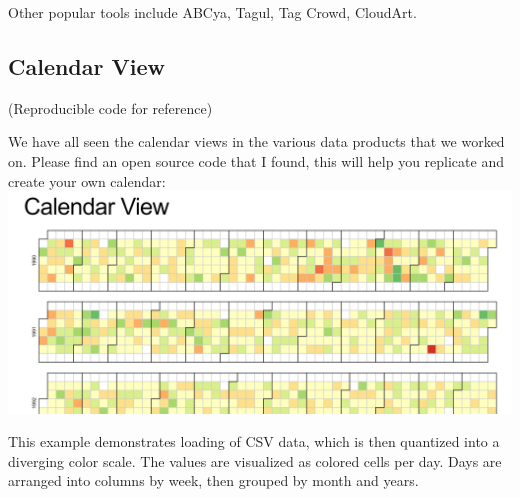 \documentclass[]{book}
\theoremstyle{definition}
\theoremstyle{definition}
\theoremstyle{definition}
\theoremstyle{remark}
\begin{document}
Other popular tools include ABCya, Tagul, Tag Crowd, CloudArt.

\subsection{Calendar View}\label{calendar-view}

(Reproducible code for reference)

\citep{Calendar_Layout}

We have all seen the calendar views in the various data products that we
worked on. Please find an open source code that I found, this will help
you replicate and create your own calendar:
\includegraphics{images/CalendarView.jpg}

\citep{CalendarView}

This example demonstrates loading of CSV data, which is then quantized
into a diverging color scale. The values are visualized as colored cells
per day. Days are arranged into columns by week, then grouped by month
and years.
\end{document}
